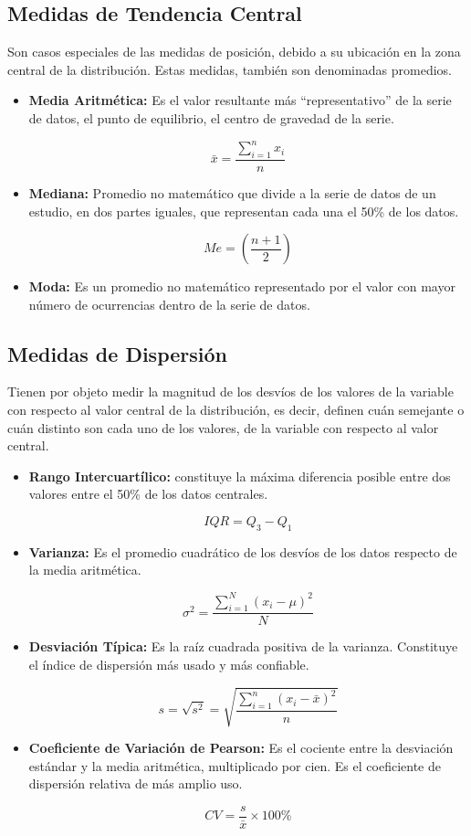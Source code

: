 \documentclass[oneside,11pt]{Latex/Classes/PhDthesisPSnPDF}
\begin{document}
\hfill\break

\subsection*{Medidas de Tendencia Central}

Son casos especiales de las medidas de posición, debido a su ubicación
en la zona central de la distribución. Estas medidas, también son
denominadas promedios.

\begin{itemize}
\item{\textbf{Media Aritmética:} Es el valor resultante más “representativo” de la serie de datos, el punto de equilibrio, el centro de gravedad de la serie.}

$$\bar{x} = \frac{\sum_{i=1}^{n} x_i}{n}$$
\item{\textbf{Mediana:} Promedio no matemático que divide a la serie de datos de un estudio, en dos partes iguales, que representan cada una el 50\% de los datos.}

 $$Me = \left(\frac{n+1}{2}\right)$$

\item{\textbf{Moda:} Es un promedio no matemático representado por el valor con mayor número de ocurrencias dentro de la serie de datos.}
\end{itemize}

\hfill\break

\subsection*{Medidas de Dispersión}

Tienen por objeto medir la magnitud de los desvíos de los valores de la
variable con respecto al valor central de la distribución, es decir,
definen cuán semejante o cuán distinto son cada uno de los valores, de
la variable con respecto al valor central.

\begin{itemize}
\item{\textbf{Rango Intercuartílico:} constituye la máxima diferencia posible entre dos valores entre el 50\% de los datos centrales.}

$$IQR = Q_3 - Q_1$$

\item{\textbf{Varianza:} Es el promedio cuadrático de los desvíos de los datos respecto de la media aritmética.}

$$\sigma^2 = \frac{\sum_{i=1}^{N} (x_i - \mu)^2}{N}$$

\item{\textbf{Desviación Típica:} Es la raíz cuadrada positiva de la varianza. Constituye el índice de dispersión más usado y más confiable.}

$$s = \sqrt{s^2} = \sqrt{\frac{\sum_{i=1}^{n} (x_i - \bar{x})^2}{n}}$$

\item{\textbf{Coeficiente de Variación de Pearson:} Es el cociente entre la desviación estándar y la media aritmética, multiplicado por cien. Es el coeficiente de dispersión relativa de más amplio uso.}

$$CV =  \frac{s}{\bar{x}} \times 100\%$$
\end{itemize}
\end{document}
